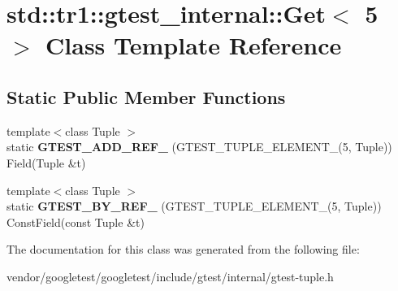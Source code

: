 \hypertarget{classstd_1_1tr1_1_1gtest__internal_1_1Get_3_015_01_4}{}\section{std\+:\+:tr1\+:\+:gtest\+\_\+internal\+:\+:Get$<$ 5 $>$ Class Template Reference}
\label{classstd_1_1tr1_1_1gtest__internal_1_1Get_3_015_01_4}
\subsection*{Static Public Member Functions}
\begin{DoxyCompactItemize}
\item 
{\footnotesize template$<$class Tuple $>$ }\\static {\bfseries G\+T\+E\+S\+T\+\_\+\+A\+D\+D\+\_\+\+R\+E\+F\+\_\+} (G\+T\+E\+S\+T\+\_\+\+T\+U\+P\+L\+E\+\_\+\+E\+L\+E\+M\+E\+N\+T\+\_\+(5, Tuple)) Field(Tuple \&t)\hypertarget{classstd_1_1tr1_1_1gtest__internal_1_1Get_3_015_01_4_a0a337088bab3f824f67d1607229fdcc2}{}\label{classstd_1_1tr1_1_1gtest__internal_1_1Get_3_015_01_4_a0a337088bab3f824f67d1607229fdcc2}

\item 
{\footnotesize template$<$class Tuple $>$ }\\static {\bfseries G\+T\+E\+S\+T\+\_\+\+B\+Y\+\_\+\+R\+E\+F\+\_\+} (G\+T\+E\+S\+T\+\_\+\+T\+U\+P\+L\+E\+\_\+\+E\+L\+E\+M\+E\+N\+T\+\_\+(5, Tuple)) Const\+Field(const Tuple \&t)\hypertarget{classstd_1_1tr1_1_1gtest__internal_1_1Get_3_015_01_4_ae10fe16450db82d69b9a4d0b149ca75d}{}\label{classstd_1_1tr1_1_1gtest__internal_1_1Get_3_015_01_4_ae10fe16450db82d69b9a4d0b149ca75d}

\end{DoxyCompactItemize}


The documentation for this class was generated from the following file\+:\begin{DoxyCompactItemize}
\item 
vendor/googletest/googletest/include/gtest/internal/gtest-\/tuple.\+h\end{DoxyCompactItemize}
